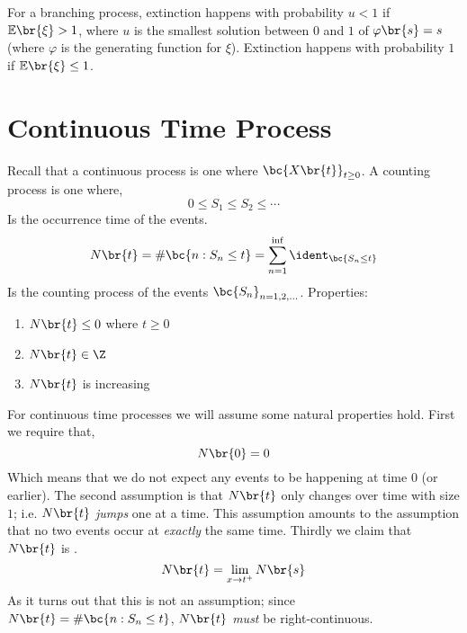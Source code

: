 \documentclass{article}
\newcommand{\Exp}{\mathbb{E}}
\begin{document}
    For a branching process, extinction happens with probability $u < 1$ if $\Exp\br{\xi} > 1$, where $u$ is the smallest solution between $0$ and $1$ of $\varphi\br{s} = s$ (where $\varphi$ is the generating function for $\xi$). Extinction happens with probability $1$ if $\Exp\br{\xi} \leq 1$. \\

    \section{Continuous Time Process}
    Recall that a continuous process is one where $\bc{X\br{t}}_{t \geq 0}$. A counting process is one where,
    \[ 0 \leq S_1 \leq S_2 \leq \cdots \]
    Is the occurrence time of the events.
    \[ N\br{t} = \# \bc{n : S_n \leq t} = \sum_{n=1}^{\inf} \ident_{\bc{S_n \leq t}} \]
    Is the counting process of the events $\bc{S_n}_{n=1,2,\ldots}$. Properties:
    \begin{enumerate}
        \item $N\br{t} \leq 0$ where $t \geq 0$
        \item $N\br{t} \in \Z$
        \item $N\br{t}$ is increasing
    \end{enumerate}
    For continuous time processes we will assume some natural properties hold. First we require that,
    \[ N\br{0} = 0 \]
    Which means that we do not expect any events to be happening at time $0$ (or earlier). The second assumption is that $N\br{t}$ only changes over time with size $1$; i.e. $N\br{t}$ \textit{jumps} one at a time. This assumption amounts to the assumption that no two events occur at \textit{exactly} the same time. Thirdly we claim that $N\br{t}$ is .
    \[ N\br{t} = \lim_{x \to t^{+}} N\br{s} \]
    As it turns out that this is not an assumption; since $N\br{t} = \# \bc{n : S_n \leq t}$, $N\br{t}$ \textit{must} be right-continuous.
\end{document}
